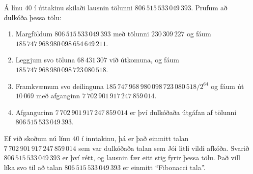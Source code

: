 Á línu 40 í úttakinu skilaði lausnin tölunni $806\,515\,533\,049\,393$. Prufum að dulkóða þessa tölu:
\begin{enumerate}
    \item Margföldum $806\,515\,533\,049\,393$ með tölunni $230\,309\,227$ og fáum $185\,747\,968\,980\,098\,654\,649\,211$.
    \item Leggjum svo töluna $68\,431\,307$ við útkomuna, og fáum $185\,747\,968\,980\,098\,723\,080\,518$.
    \item Framkvæmum svo deilinguna $185\,747\,968\,980\,098\,723\,080\,518 / 2^{64}$ og fáum út $10\,069$ með afganginn $7\,702\,901\,917\,247\,859\,014$.
    \item Afgangurinn $7\,702\,901\,917\,247\,859\,014$ er því dulkóðaða útgáfan af tölunni $806\,515\,533\,049\,393$.
\end{enumerate}
Ef við skoðum nú línu 40 í inntakinu, þá er það einmitt talan $7\,702\,901\,917\,247\,859\,014$
sem var dulkóðaða talan sem Jói litli vildi afkóða. Svarið $806\,515\,533\,049\,393$ er því rétt, og
lausnin fær eitt stig fyrir þessa tölu. Það vill líka svo til að talan $806\,515\,533\,049\,393$ er
einmitt ``Fibonacci tala''.

